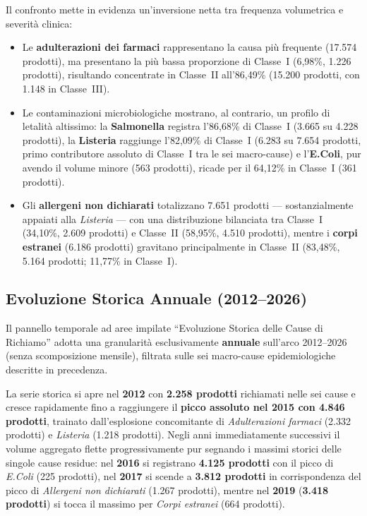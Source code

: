 Il confronto mette in evidenza un'inversione netta tra frequenza volumetrica e severità clinica:
\begin{itemize}
    \item Le \textbf{adulterazioni dei farmaci} rappresentano la causa più frequente (17.574 prodotti), ma presentano la più bassa proporzione di Classe~I (6,98\%, 1.226 prodotti), risultando concentrate in Classe~II all'86,49\% (15.200 prodotti, con 1.148 in Classe~III).
    \item Le contaminazioni microbiologiche mostrano, al contrario, un profilo di letalità altissimo: la \textbf{Salmonella} registra l'86,68\% di Classe~I (3.665 su 4.228 prodotti), la \textbf{Listeria} raggiunge l'82,09\% di Classe~I (6.283 su 7.654 prodotti, primo contributore assoluto di Classe~I tra le sei macro-cause) e l'\textbf{E.Coli}, pur avendo il volume minore (563 prodotti), ricade per il 64,12\% in Classe~I (361 prodotti).
    \item Gli \textbf{allergeni non dichiarati} totalizzano 7.651 prodotti --- sostanzialmente appaiati alla \textit{Listeria} --- con una distribuzione bilanciata tra Classe~I (34,10\%, 2.609 prodotti) e Classe~II (58,95\%, 4.510 prodotti), mentre i \textbf{corpi estranei} (6.186 prodotti) gravitano principalmente in Classe~II (83,48\%, 5.164 prodotti; 11,77\% in Classe~I).
\end{itemize}

\subsection{Evoluzione Storica Annuale (2012--2026)}

Il pannello temporale ad aree impilate ``Evoluzione Storica delle Cause di Richiamo'' adotta una granularità esclusivamente \textbf{annuale} sull'arco 2012--2026 (senza scomposizione mensile), filtrata sulle sei macro-cause epidemiologiche descritte in precedenza.

La serie storica si apre nel \textbf{2012} con \textbf{2.258 prodotti} richiamati nelle sei cause e cresce rapidamente fino a raggiungere il \textbf{picco assoluto nel 2015 con 4.846 prodotti}, trainato dall'esplosione concomitante di \textit{Adulterazioni farmaci} (2.332 prodotti) e \textit{Listeria} (1.218 prodotti). Negli anni immediatamente successivi il volume aggregato flette progressivamente pur segnando i massimi storici delle singole cause residue: nel \textbf{2016} si registrano \textbf{4.125 prodotti} con il picco di \textit{E.Coli} (225 prodotti), nel \textbf{2017} si scende a \textbf{3.812 prodotti} in corrispondenza del picco di \textit{Allergeni non dichiarati} (1.267 prodotti), mentre nel \textbf{2019} (\textbf{3.418 prodotti}) si tocca il massimo per \textit{Corpi estranei} (664 prodotti).

